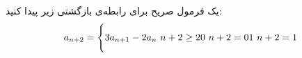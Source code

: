 	\p
	یک فرمول صریح برای رابطه‌ی بازگشتی زیر پیدا کنید:
  \begin{equation}
  a_{n+2} = \Bigg\{3a_{n+1} - 2a_n \ n + 2 \geq 2 \newline
  0 \ n + 2 = 0 \newline
  1 \ n + 2 = 1
  \end{equation}